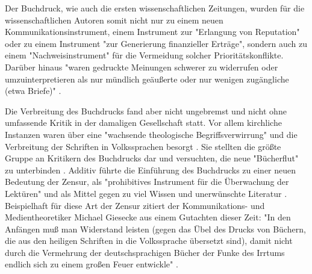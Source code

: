 Der Buchdruck, wie auch die ersten wissenschaftlichen Zeitungen, wurden für die wissenschaftlichen Autoren somit nicht nur zu einem neuen Kommunikationsinstrument, einem Instrument zur "Erlangung von Reputation" oder zu einem Instrument "zur Generierung finanzieller Erträge", sondern auch zu einem "Nachweisinstrument" \cite[:8]{Schirmbacher_2009} für die Vermeidung solcher Prioritätskonflikte. Darüber hinaus "waren gedruckte Meinungen schwerer zu widerrufen oder umzuinterpretieren als nur mündlich geäußerte oder nur wenigen zugängliche (etwa Briefe)" \cite{Luhmann_1997}.

Die Verbreitung des Buchdrucks fand aber nicht ungebremst und nicht ohne umfassende Kritik in der damaligen Gesellschaft statt. Vor allem kirchliche Instanzen waren über eine "wachsende theologische Begriffsverwirrung" und die Verbreitung der Schriften in Volkssprachen besorgt \cite{Giesecke_1991}. Sie stellten die größte Gruppe an Kritikern des Buchdrucks dar und versuchten, die neue "Bücherflut" zu unterbinden \cite{Giesecke_1991}. Additiv führte die Einführung des Buchdrucks zu einer neuen Bedeutung der Zensur, als "prohibitives Instrument für die Überwachung der Lektüren" \cite[:16]{Wunderlich_2008} und als Mittel gegen zu viel Wissen und unerwünschte Literatur \cite{Giesecke_1991}. Beispielhaft für diese Art der Zensur zitiert der Kommunikations- und Medientheoretiker Michael Giesecke aus einem Gutachten dieser Zeit: "In den Anfängen muß man Widerstand leisten (gegen das Übel des Drucks von Büchern, die aus den heiligen Schriften in die Volkssprache übersetzt sind), damit nicht durch die Vermehrung der deutschsprachigen Bücher der Funke des Irrtums endlich sich zu einem großen Feuer entwickle" \cite{Giesecke_1991}.

